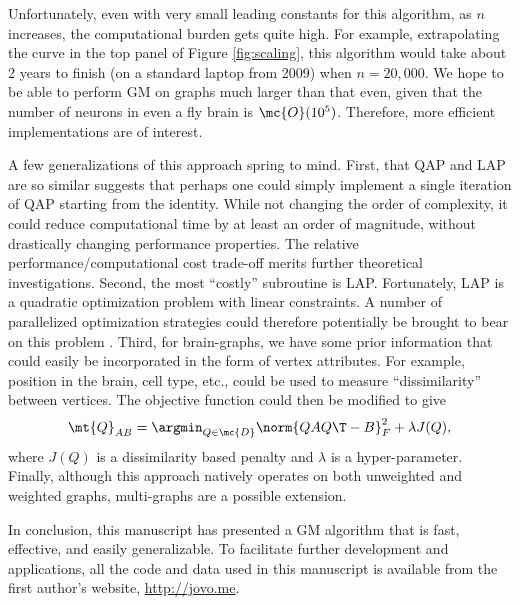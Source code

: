 \documentclass[10pt,journal,cspaper,compsoc]{IEEEtran}
\begin{document}
Unfortunately, even with very small leading constants for this algorithm, as $n$ increases, the computational burden gets quite high.  For example, extrapolating the curve in the top panel of Figure \ref{fig:scaling}, this algorithm would take about 2 years to finish (on a standard laptop from 2009) when $n=20,000$.  We hope to be able to perform GM on graphs much larger than that even, given that the number of neurons in even a fly brain is $\mc{O}(10^5)$.  Therefore, more efficient implementations are of interest.  

A few generalizations of this approach spring to mind.  First, that QAP and LAP are so similar suggests that perhaps one could simply implement a single iteration of QAP starting from the identity.  While not changing the order of complexity, it could reduce computational time by at least an order of magnitude, without drastically changing performance properties.  The relative performance/computational cost trade-off merits further theoretical investigations.  Second, the most ``costly'' subroutine is LAP.  Fortunately, LAP is a quadratic optimization problem with linear constraints.  A number of parallelized optimization strategies could therefore potentially be brought to bear on this problem \cite{Boyd2011}.  Third, for brain-graphs, we have some prior information that could easily be incorporated in the form of vertex attributes.  For example, position in the brain, cell type, etc., could be used to measure ``dissimilarity'' between vertices.  The objective function could then be modified to give
\begin{align} \label{eq:Jqap}
	\mt{Q}_{AB}= \argmin_{Q \in \mc{D}} \norm{Q A Q\T - B}^2_F + \lambda J(Q),
\end{align}
where $J(Q)$ is a dissimilarity based penalty and $\lambda$ is a hyper-parameter.  Finally, although this approach natively operates on both unweighted and weighted graphs, multi-graphs are a possible extension.

In conclusion, this manuscript has presented a GM algorithm that is fast, effective, and easily generalizable.  To facilitate further development and applications, all the code and data used in this manuscript is available from the first author's website, \url{http://jovo.me}.












\ifCLASSOPTIONcompsoc
\end{document}
